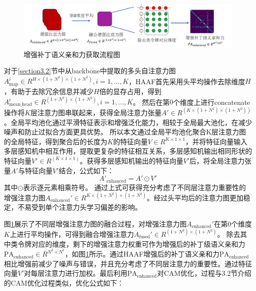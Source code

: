 \begin{figure}[t]
    \centerline{\includegraphics[width=6in]{fig/fig4.pdf}}
    \begin{CJK*}{UTF8}{fs}
        \caption{增强补丁语义亲和力获取流程图}\label{fig4}
    \end{CJK*}
\end{figure}

对于\ref{section3.2}节中从backbone中提取的多头自注意力图$A_\text{map}^i\in R^{H\times (1+N^2)\times (1+N^2)},i=1,…,K$，HAAF首先采用头平均操作去除维度$H$，有助于去除冗余信息并减少$H$倍的显存占用，得到$A_\text{mean\_head}^i\in R^{(1+N^2)\times (1+N^2)},i=1,…,K$。
然后在第$0$个维度上进行concatenate操作将$K$层注意力图串联起来，获得全局注意力张量$A'\in R^(K\times (1+N^2)\times (1+N^2) )$。全局平均池化通过平滑特征表示和增强泛化能力，相较于全局最大池化，在减少噪声和防止过拟合方面更具优势。
所以本文通过全局平均池化聚合K层注意力图的全局特征，得到聚合后的长度为$K$的特征向量$V\in R^{K\times 1\times 1}$，并将特征向量输入多层感知机中相互作用，提取更复杂的特征相互关系，多层感知机输出相同形状的特征向量$V'\in R^(K\times 1\times 1)$。获得多层感知机输出的特征向量$V'$后，将全局注意力张量$A'$与特征向量$V'$结合，公式如下：
\begin{equation}
    A'_\text{enhanced} = A' \odot V'
\end{equation}
其中$\odot$表示逐元素相乘符号。
通过上式可获得充分考虑了不同层注意力重要性的增强注意力图$A_\text{enhanced}'\in R^{K\times (1+N^2)\times (1+N^2)}$。经过头平均后的注意力图更加稳定，不易受到单个注意力头学习偏差的影响。




图\ref{fig4}展示了不同层增强注意力图的融合过程，对增强注意力图$A_\text{enhanced}'$在第$0$个维度$K$上进行平均操作，可得到融合增强注意力$A_\text{fused}'\in R^{(1+N^2)\times (1+N^2)}$。
除去其中类令牌对应的维度，剩下的增强注意力权重可作为增强后的补丁级语义亲和力$\text{PA}_\text{enhanced}\in R^{N^2\times N^2}$，如图\ref{fig4}所示。通过HAAF增强后的补丁语义亲和力$\text{PA}_\text{enhanced}$相比增强前减少了噪声与错误，并且充分考虑了不同层注意力的重要性。通过特征向量$V'$对每层注意力进行加权。最后利用$\text{PA}_\text{enhanced}$对CAM优化，过程与3.2节介绍的CAM优化过程类似，优化公式如下：

